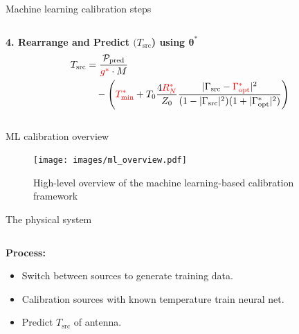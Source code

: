 \documentclass[aspectratio=169]{beamer}
\begin{document}
\begin{frame}{\small{Machine learning calibration steps}}
\begin{columns}
\begin{column}{0.5\textwidth}
			\textbf{4. Rearrange and Predict $(T_{\text{src}}$) using $\boldsymbol{\theta}^{*}$}
			\begin{align}
				T_{\text{src}} & = \frac{\mathcal{P}_{\text{pred}}}{\textcolor{red}{g^*} \cdot M} \nonumber \\
				               & \quad - \left( \textcolor{red}{T_{\text{min}}^*}
				+ T_0 \frac{4\textcolor{red}{R_N^*}}{Z_0} \frac{|\Gamma_{\text{src}} - \textcolor{red}{\Gamma_{\text{opt}}^*}|^2}{(1 - |\Gamma_{\text{src}}|^2)(1 + |\Gamma_{\text{opt}}^*|^2)} \right)
			\end{align}
			\vfill
		\end{column}
	\end{columns}
\end{frame}

\begin{frame}{\small{ML calibration overview}}
	\begin{figure}[h]
		\centering
		\texttt{[image: images/ml\_overview.pdf]}
		\caption{High-level overview of the machine learning-based calibration framework}
	\end{figure}
\end{frame}

\begin{frame}{\small{The physical system}}
	\begin{columns}
		\begin{column}{0.3\textwidth}
			\textbf{Process:}
			\begin{itemize}
				\item Switch between sources to generate training data.
				\item Calibration sources with known temperature train neural net.
				\item Predict $T_{\text{src}}$ of antenna.
			\end{itemize}
		\end{column}

		\begin{column}{0.7\textwidth}
			\begin{figure}
				\centering
				
			\end{figure}
		\end{column}
	\end{columns}
	\vfill
\end{frame}
\end{document}
